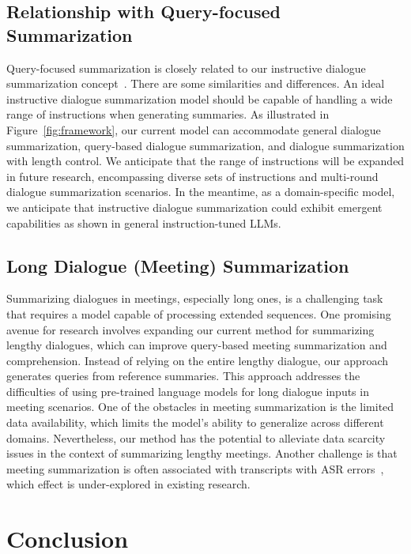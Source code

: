 \documentclass[11pt]{article}
\begin{document}
    \subsection{Relationship with Query-focused Summarization}

        Query-focused summarization is closely related to our instructive dialogue summarization concept~\cite{vig-etal-2022-exploring}. There are some similarities and differences. An ideal instructive dialogue summarization model should be capable of handling a wide range of instructions when generating summaries. As illustrated in Figure~\ref{fig:framework}, our current model can accommodate general dialogue summarization, query-based dialogue summarization, and dialogue summarization with length control. We anticipate that the range of instructions will be expanded in future research, encompassing diverse sets of instructions and multi-round dialogue summarization scenarios. In the meantime, as a domain-specific model, we anticipate that instructive dialogue summarization could exhibit emergent capabilities as shown in general instruction-tuned LLMs.

    \subsection{Long Dialogue (Meeting) Summarization}

        Summarizing dialogues in meetings, especially long ones, is a challenging task that requires a model capable of processing extended sequences. One promising avenue for research involves expanding our current method for summarizing lengthy dialogues, which can improve query-based meeting summarization and comprehension. Instead of relying on the entire lengthy dialogue, our approach generates queries from reference summaries. This approach addresses the difficulties of using pre-trained language models for long dialogue inputs in meeting scenarios.
        One of the obstacles in meeting summarization is the limited data availability, which limits the model's ability to generalize across different domains. Nevertheless, our method has the potential to alleviate data scarcity issues in the context of summarizing lengthy meetings. Another challenge is that meeting summarization is often associated with transcripts with ASR errors~\cite{jiang-etal-2023-speech}, which effect is under-explored in existing research.
        
\section{Conclusion}
\end{document}
